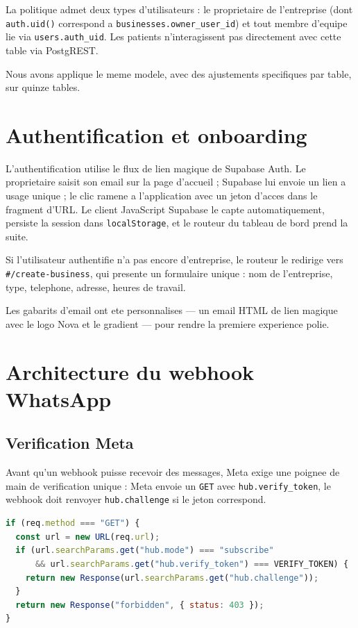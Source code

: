 La politique admet deux types d'utilisateurs : le proprietaire de
l'entreprise (dont \texttt{auth.uid()} correspond a
\texttt{businesses.owner\_user\_id}) et tout membre d'equipe lie via
\texttt{users.auth\_uid}. Les patients n'interagissent pas
directement avec cette table via PostgREST.

Nous avons applique le meme modele, avec des ajustements specifiques
par table, sur quinze tables.

\section{Authentification et onboarding}
L'authentification utilise le flux de lien magique de Supabase Auth.
Le proprietaire saisit son email sur la page d'accueil ; Supabase lui
envoie un lien a usage unique ; le clic ramene a l'application avec
un jeton d'acces dans le fragment d'URL. Le client JavaScript Supabase
le capte automatiquement, persiste la session dans \texttt{localStorage},
et le routeur du tableau de bord prend la suite.

Si l'utilisateur authentifie n'a pas encore d'entreprise, le routeur
le redirige vers \texttt{\#/create-business}, qui presente un
formulaire unique : nom de l'entreprise, type, telephone, adresse,
heures de travail.

Les gabarits d'email ont ete personnalises --- un email HTML de lien
magique avec le logo Nova et le gradient --- pour rendre la premiere
experience polie.

\section{Architecture du webhook WhatsApp}

\subsection{Verification Meta}
Avant qu'un webhook puisse recevoir des messages, Meta exige une
poignee de main de verification unique : Meta envoie un \texttt{GET}
avec \texttt{hub.verify\_token}, le webhook doit renvoyer
\texttt{hub.challenge} si le jeton correspond.

\begin{lstlisting}[language=JavaScript,caption={Poignee de main de verification webhook Meta}]
if (req.method === "GET") {
  const url = new URL(req.url);
  if (url.searchParams.get("hub.mode") === "subscribe"
      && url.searchParams.get("hub.verify_token") === VERIFY_TOKEN) {
    return new Response(url.searchParams.get("hub.challenge"));
  }
  return new Response("forbidden", { status: 403 });
}
\end{lstlisting}

